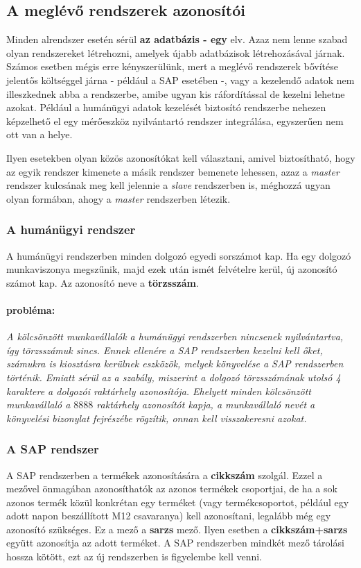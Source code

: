 \documentclass[a4paper,12pt]{report}
\begin{document}
\subsection{A meglévő rendszerek azonosítói}

Minden alrendszer esetén sérül \textbf{az adatbázis - egy} elv. Azaz nem lenne 
szabad olyan rendszereket létrehozni, amelyek újabb adatbázisok létrehozásával 
járnak. Számos esetben mégis erre kényszerülünk, mert a meglévő rendszerek 
bővítése jelentős költséggel járna - például a SAP esetében -, vagy a kezelendő 
adatok nem illeszkednek abba a rendszerbe, amibe ugyan kis ráfordítással de 
kezelni lehetne azokat. Például a humánügyi adatok kezelését biztosító 
rendszerbe nehezen képzelhető el egy mérőeszköz nyilvántartó rendszer 
integrálása, egyszerűen nem ott van a helye.

Ilyen esetekben olyan közös azonosítókat kell választani, amivel biztosítható,
hogy az egyik rendszer kimenete a másik rendszer bemenete lehessen, azaz a 
\textit{master} rendszer kulcsának meg kell jelennie a \textit{slave} 
rendszerben is, méghozzá ugyan olyan formában, ahogy a \textit{master} 
rendszerben létezik. 

\subsubsection{A humánügyi rendszer}
A humánügyi rendszerben minden dolgozó egyedi sorszámot kap. Ha egy dolgozó 
munkaviszonya megszűnik, majd ezek után ismét felvételre kerül, új azonosító 
számot kap. Az azonosító neve a \textbf{törzsszám}.
\paragraph*{probléma:}
\textit{ 
A kölcsönzött munkavállalók a humánügyi rendszerben nincsenek nyilvántartva, 
így törzsszámuk sincs. Ennek ellenére a SAP rendszerben kezelni kell őket, 
számukra is kiosztásra kerülnek eszközök, melyek könyvelése a SAP rendszerben 
történik. Emiatt sérül az a szabály, miszerint a dolgozó törzsszámának utolsó 4 
karaktere a dolgozói raktárhely azonosítója. Ehelyett minden kölcsönzött 
munkavállaló a $8888$ raktárhely azonosítót kapja, a munkavállaló nevét a 
könyvelési bizonylat fejrészébe rögzítik, onnan kell visszakeresni azokat.
}

\subsubsection{A SAP rendszer}
A SAP rendszerben a termékek azonosítására a \textbf{cikkszám} szolgál. Ezzel a
mezővel önmagában azonosíthatók az azonos termékek csoportjai, de ha a sok 
azonos termék közül konkrétan egy terméket (vagy termékcsoportot, például egy 
adott napon beszállított M12 csavaranya) kell 
azonosítani, legalább még egy azonosító szükséges. Ez a mező a \textbf{sarzs} 
mező. Ilyen esetben a \textbf{cikkszám+sarzs} együtt azonosítja az adott 
terméket. A SAP rendszerben mindkét mező tárolási hossza kötött, ezt az új 
rendszerben is figyelembe kell venni.
\end{document}
